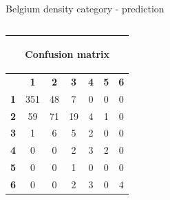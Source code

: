 \documentclass[c]{beamer}
\begin{document}
\begin{frame}
\begin{columns}
\begin{column}{0.5\textwidth}
\begin{overlayarea}{\linewidth}{4cm}
  \end{overlayarea}
  \begin{overlayarea}{\linewidth}{0.5cm}
    \centering
    \tiny Belgium density category - prediction\par
  \end{overlayarea}
 \end{column}
\end{columns}
\begin{columns}
 \begin{column}{0.6\textwidth}
 \begin{overlayarea}{\linewidth}{2cm}
  \begin{table}
  \begin{center}
  \begin{adjustbox}{max width=0.6\textwidth}
  {\tiny
  \begin{tabular}{|c|c|c|c|c|c|c|}
    \hline
    \multicolumn{7}{|c|}{{\tiny \begin{bf}Confusion matrix\end{bf}}} \\
    \hline
     & \textbf{1} & \textbf{2} & \textbf{3} & \textbf{4} & \textbf{5} & \textbf{6}\\
    \hline
    \textbf{1} & 351 & 48 & 7 & 0 & 0 & 0\\
    \hline
    \textbf{2} & 59 & 71 & 19 & 4 & 1 & 0\\
    \hline
    \textbf{3} & 1 & 6 & 5 & 2 & 0 & 0\\
    \hline
    \textbf{4} & 0 & 0 & 2 & 3 & 2 & 0\\
    \hline
    \textbf{5} & 0 & 0 & 1 & 0 & 0 & 0\\
    \hline
    \textbf{6} & 0 & 0 & 2 & 3 & 0 & 4\\
    \hline
  \end{tabular}
  }
  \end{adjustbox}
  \end{center}
  \end{table}
 \end{overlayarea}
 \end{column}
 \begin{column}{0.6\textwidth}

\end{column}
\end{columns}
\end{frame}
\end{document}
